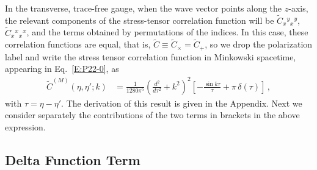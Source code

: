 \documentclass[preprint,prd,showpacs,superscriptaddress]{revtex4}
\begin{document}
In the transverse, trace-free gauge, when the wave vector points along the $z$-axis, the relevant components of the 
stress-tensor correlation function will be $\widetilde{C}_{x}{}^{y}{}_{x}{}^{y}$, $\widetilde{C}_{x}{}^{x}{}_{x}{}^{x}$, 
and the terms obtained by permutations of the indices. In this case, these correlation functions are equal, that is, 
 $\widetilde{C}\equiv\widetilde{C}_{\times}=\widetilde{C}_{+}$, so we drop the polarization label and write the stress 
 tensor correlation function in Minkowski spacetime, appearing in Eq.~\eqref{E:P22-0}, as
\begin{align}\label{E:C}
	\widetilde{C}^{(M)}(\eta,\eta';{k})&=\frac{1}{1280\pi^{5}}\left(\frac{d^{2}}{d\tau^{2}}+
	k^{2}\right)^{2}\left[-\frac{\sin k\tau}{\tau}+\pi\,\delta(\tau)\right]\,,
\end{align}
with $\tau=\eta-\eta'$. The derivation of this result is given in the Appendix.
Next we consider separately the contributions of the two terms in brackets in the above
expression.

\subsection{Delta Function Term}
\end{document}
